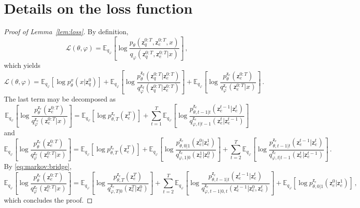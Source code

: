 \documentclass[nohyperref]{article}
\theoremstyle{plain}
\theoremstyle{definition}
\theoremstyle{remark}
\newcommand{\latentcont}{\mathsf{z}_e}
\newcommand{\latentdis}{\mathsf{z}_q}
\begin{document}
\section{Details on the loss function}
\label{ap:loss}
\begin{proof}[Proof of Lemma~\ref{lem:loss}]
By definition,
$$
\mathcal{L}(\theta,\varphi) = \mathbb{E}_{q_{\varphi}}\left[\log \frac{p_{\theta}(\latentdis^{0:T},\latentcont^{0:T},x)}{q_{\varphi}(\latentdis^{0:T},\latentcont^{0:T}| x)}\right]\,,
$$
which yields
$$
 \mathcal{L}(\theta,\varphi) = \mathbb{E}_{q_{\varphi}}\left[\log p^x_{\theta}(x|\latentdis^{0})\right]   + \mathbb{E}_{q_{\varphi}}\left[\log \frac{p^{\latentdis}_{\theta}(\latentdis^{0:T}|\latentcont^{0:T})}{q^{\latentdis}_{\varphi}(\latentdis^{0:T}|\latentcont^{0:T})}\right] +\mathbb{E}_{q_{\varphi}}\left[\log \frac{p^{\latentcont}_{\theta}(\latentcont^{0:T})}{q^{\latentcont}_{\varphi}(\latentcont^{0:T}| x)}\right]\,.
$$
The last term may be decomposed as
$$
\mathbb{E}_{q_{\varphi}}\left[\log \frac{p^{\latentcont}_{\theta}(\latentcont^{0:T})}{q^{\latentcont}_{\varphi}(\latentcont^{0:T}| x)}\right] = \mathbb{E}_{q_{\varphi}}\left[\log p^{\latentcont}_{\theta,T}(\latentcont^{T})\right] + \sum_{t=1}^T \mathbb{E}_{q_{\varphi}}\left[\log \frac{p^{\latentcont}_{\theta,t-1|t}(\latentcont^{t-1}|\latentcont^{t})}{q^{\latentcont}_{\varphi,t|t-1}(\latentcont^{t}|\latentcont^{t-1})}\right]
$$
and
$$
\mathbb{E}_{q_{\varphi}}\left[\log \frac{p^{\latentcont}_{\theta}(\latentcont^{0:T})}{q^{\latentcont}_{\varphi}(\latentcont^{0:T}| x)}\right] = \mathbb{E}_{q_{\varphi}}\left[\log p^{\latentcont}_{\theta,T}(\latentcont^{T})\right] +\mathbb{E}_{q_{\varphi}}\left[\log \frac{p^{\latentcont}_{\theta,0|1}(\latentcont^{0}|\latentcont^{1})}{q^{\latentcont}_{\varphi,1|0}(\latentcont^{1}|\latentcont^{0})}\right] + \sum_{t=2}^T \mathbb{E}_{q_{\varphi}}\left[\log \frac{p^{\latentcont}_{\theta,t-1|t}(\latentcont^{t-1}|\latentcont^{t})}{q^{\latentcont}_{\varphi,t|t-1}(\latentcont^{t}|\latentcont^{t-1})}\right]\,.
$$
By \eqref{eq:markov:bridge},
$$
\mathbb{E}_{q_{\varphi}}\left[\log \frac{p^{\latentcont}_{\theta}(\latentcont^{0:T})}{q^{\latentcont}_{\varphi}(\latentcont^{0:T}| x)}\right] = \mathbb{E}_{q_{\varphi}}\left[\log \frac{p^{\latentcont}_{\theta,T}(\latentcont^{T})}{q^{\latentcont}_{\varphi,T|0}(\latentcont^{T}|\latentcont^{0})}\right] + \sum_{t=2}^T \mathbb{E}_{q_{\varphi}}\left[\log \frac{p^{\latentcont}_{\theta,t-1|t}(\latentcont^{t-1}|\latentcont^{t})}{q^{\latentcont}_{\varphi,t-1|0,t}(\latentcont^{t-1}|\latentcont^{0},\latentcont^{t})}\right] + \mathbb{E}_{q_{\varphi}}\left[\log p^{\latentcont}_{\theta,0|1}(\latentcont^{0}|\latentcont^{1})\right]\,,
$$
which concludes the proof.
\end{proof}
\end{document}
